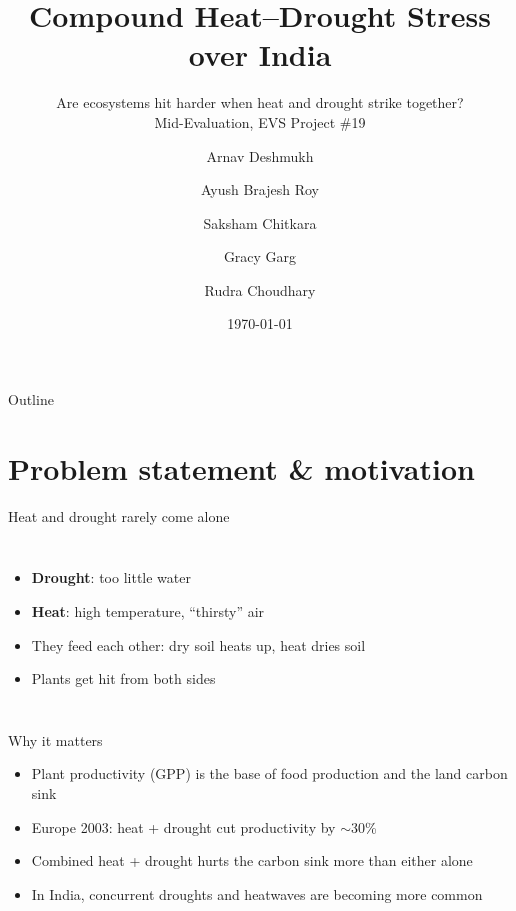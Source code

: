 \documentclass[11pt,aspectratio=169]{beamer}
\title[Compound Heat-Drought Stress]{Compound Heat--Drought Stress over India}
\subtitle{Are ecosystems hit harder when heat and drought strike together?\\[2pt]
  \small Mid-Evaluation, EVS Project \#19}
\author[Deshmukh et al.]{
  Arnav Deshmukh \and Ayush Brajesh Roy \and Saksham Chitkara \and
  Gracy Garg \and Rudra Choudhary
}
\institute{IIIT Hyderabad}
\date{\today}
\begin{document}
\frame{\titlepage}

\begin{frame}{Outline}
  \tableofcontents
\end{frame}

\section{Problem statement \& motivation}

\begin{frame}{Heat and drought rarely come alone}
  \begin{columns}
    \begin{itemize}
      \item \textbf{Drought}: too little water
      \item \textbf{Heat}: high temperature, ``thirsty'' air
      \item They feed each other: dry soil heats up, heat dries soil
      \item Plants get hit from both sides
    \end{itemize}
    \centering
  \end{columns}
\end{frame}

\begin{frame}{Why it matters}
  \begin{itemize}
    \item Plant productivity (GPP) is the base of food production and the
      land carbon sink
    \item Europe 2003: heat + drought cut productivity by $\sim$30\%
      \citep{ciais2005}
    \item Combined heat + drought hurts the carbon sink more than either alone
      \citep{vonbuttlar2018}
    \item In India, concurrent droughts and heatwaves are becoming more common
      \citep{sharma2017}
  \end{itemize}
\end{frame}
\end{document}
